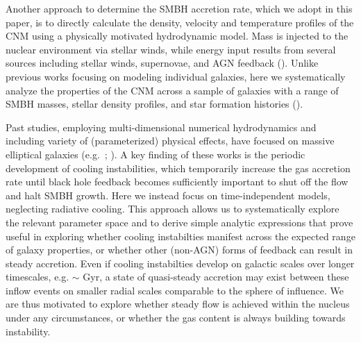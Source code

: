 \documentclass[usenatbib,fleqn]{mn2e}
\begin{document}

Another approach to determine the SMBH accretion rate, which we adopt in this paper, is to directly calculate the density, velocity and temperature profiles of the CNM using a physically motivated
hydrodynamic model.  Mass is injected to the nuclear environment via
stellar winds, while energy input results from several sources including stellar winds, supernovae, and AGN feedback (\citealt{Quataert:2004a,De-ColleGuillochon+:2012a,ShcherbakovWong+:2014a}).  Unlike previous works focusing on modeling individual galaxies, here we systematically analyze the properties of the CNM across a sample of galaxies with a range of SMBH masses, stellar density profiles, and star formation histories (\citealt{WangMerritt:2004a}).  

Past studies, employing multi-dimensional numerical hydrodynamics and including variety of (parameterized) physical effects, have focused on massive elliptical galaxies (e.g.~\citealt{Ciotti&Ostriker07}; \citealt{Ciotti+10}).  A key finding of these works is the periodic development of cooling instabilities, which temporarily increase the gas accretion rate until black hole feedback becomes sufficiently important to shut off the flow and halt SMBH growth.  Here we instead focus on time-independent models, neglecting radiative cooling.  This approach allows us to systematically explore the relevant parameter space and to derive simple analytic expressions that prove useful in exploring whether cooling instabilties manifest across the expected range of galaxy properties, or whether other (non-AGN) forms of feedback can result in steady accretion.  Even if cooling instabilties develop on galactic scales over longer timescales, e.g. $\sim$ Gyr, a state of quasi-steady accretion may exist between these inflow events on smaller radial scales comparable to the sphere of influence.  We are thus motivated to explore whether steady flow is achieved within the nucleus under any circumstances, or whether the gas content is always building towards instability.  
\end{document}
